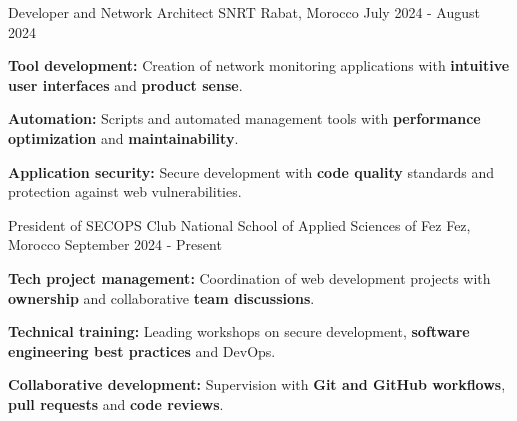 \begin{cventries}
    \cventry
    {Developer and Network Architect} %
    {SNRT} %
    {Rabat, Morocco} %
    {July 2024 - August 2024} %
    {
        \begin{cvitems} %
            \item {\textbf{Tool development:} Creation of network monitoring applications with \textbf{intuitive user interfaces} and \textbf{product sense}.}
            \item {\textbf{Automation:} Scripts and automated management tools with \textbf{performance optimization} and \textbf{maintainability}.}
            \item {\textbf{Application security:} Secure development with \textbf{code quality} standards and protection against web vulnerabilities.}
        \end{cvitems}
    }

    \cventry
    {President of SECOPS Club}
    {National School of Applied Sciences of Fez} %
    {Fez, Morocco} %
    {September 2024 - Present} %
    {
        \begin{cvitems} %
            \item {\textbf{Tech project management:} Coordination of web development projects with \textbf{ownership} and collaborative \textbf{team discussions}.}
            \item {\textbf{Technical training:} Leading workshops on secure development, \textbf{software engineering best practices} and DevOps.}
            \item {\textbf{Collaborative development:} Supervision with \textbf{Git and GitHub workflows}, \textbf{pull requests} and \textbf{code reviews}.}
        \end{cvitems}
    }
\end{cventries}